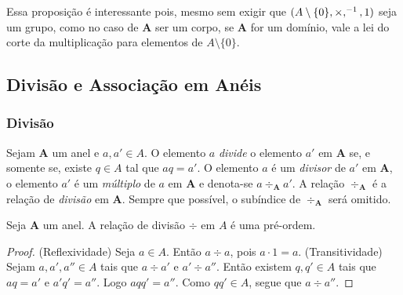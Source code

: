 Essa proposição é interessante pois, mesmo sem exigir que $(A \setminus \{0\},\times,^{-1},1)$ seja um grupo, como no caso de $\bm A$ ser um corpo, se $\textbf{A}$ for um domínio, vale a lei do corte da multiplicação para elementos de $A \setminus \{0\}$.




\subsection{Divisão e Associação em Anéis}

\subsubsection{Divisão}


\begin{defi}
Sejam $\bm A$ um anel e $a,a' \in A$. O elemento $a$ \emph{divide} o elemento $a'$ em $\bm A$ se, e somente se, existe $q \in A$ tal que $aq=a'$. O elemento $a$ é um \emph{divisor} de $a'$ em $\bm A$, o elemento $a'$ é um \emph{múltiplo} de $a$ em $\bm A$ e denota-se $a \div_{\bm A} a'$. A relação $\div_{\bm A}$ é a relação de \emph{divisão} em $\bm A$. Sempre que possível, o subíndice de $\div_{\bm A}$ será omitido.
\end{defi}

\begin{prop}
Seja $\bm A$ um anel. A relação de divisão $\div$ em $A$ é uma pré-ordem.
\end{prop}
\begin{proof}
(Reflexividade) Seja $a \in A$. Então $a \div a$, pois $a \cdot 1 = a$. (Transitividade) Sejam $a,a',a'' \in A$ tais que $a \div a'$ e $a' \div a''$. Então existem $q,q' \in A$ tais que $aq=a'$ e $a'q'=a''$. Logo $aqq'=a''$. Como $qq' \in A$, segue que $a \div a''$.
\end{proof}

